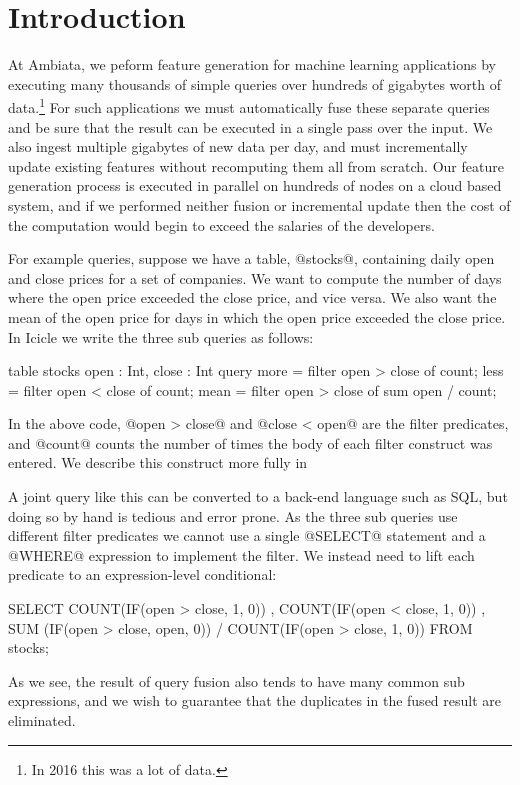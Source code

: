 \section{Introduction}
\label{s:Introduction}

At Ambiata, we peform feature generation for machine learning applications by executing many thousands of simple queries over hundreds of gigabytes worth of data.\footnote{In 2016 this was a lot of data.} For such applications we must automatically fuse these separate queries and be sure that the result can be executed in a single pass over the input. We also ingest multiple gigabytes of new data per day, and must incrementally update existing features without recomputing them all from scratch. Our feature generation process is executed in parallel on hundreds of nodes on a cloud based system, and if we performed neither fusion or incremental update then the cost of the computation would begin to exceed the salaries of the developers.

For example queries, suppose we have a table, @stocks@, containing daily open and close prices for a set of companies. We want to compute the number of days where the open price exceeded the close price, and vice versa. We also want the mean of the open price for days in which the open price exceeded the close price. In Icicle we write the three sub queries as follows:

\begin{code}
table stocks { open : Int, close : Int }
query 
  more  = filter open > close of count;
  less  = filter open < close of count;
  mean  = filter open > close of sum open / count;
\end{code}
In the above code, @open > close@ and @close < open@ are the filter predicates, and @count@ counts the number of times the body of each filter construct was entered. We describe this construct more fully in \REF

A joint query like this can be converted to a back-end language such as SQL, but doing so by hand is tedious and error prone. As the three sub queries use different filter predicates we cannot use a single @SELECT@ statement and a @WHERE@ expression to implement the filter. We instead need to lift each predicate to an expression-level conditional:
\begin{code}
  SELECT COUNT(IF(open > close, 1, 0))
       , COUNT(IF(open < close, 1, 0))
       , SUM  (IF(open > close, open, 0))
       / COUNT(IF(open > close, 1, 0))
  FROM stocks;
\end{code}
As we see, the result of query fusion also tends to have many common sub expressions, and we wish to guarantee that the duplicates in the fused result are eliminated.

